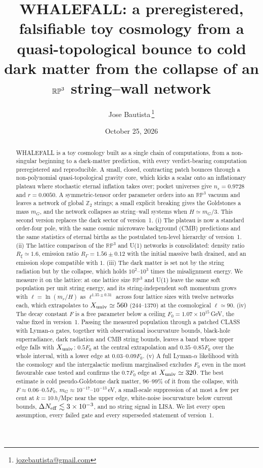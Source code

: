 \documentclass[11pt,a4paper]{article}
\title{\textbf{WHALEFALL: a preregistered, falsifiable toy cosmology from a quasi-topological bounce to cold dark matter from the collapse of an $\RP$ string--wall network}}
\author{Jose Bautista\,\orcidlink{0009-0001-6655-4028}\thanks{\href{mailto:jozebautista@gmail.com}{jozebautista@gmail.com}}}
\date{October 25, 2026}
\newcommand{\RP}{\mathbb{RP}^3}
\newcommand{\Ztwo}{\mathbb{Z}_2}
\newcommand{\RG}{R_\Gamma}
\newcommand{\Rxi}{R_\xi}
\newcommand{\Xu}{X_{\rm univ}}
\begin{document}
\maketitle

\begin{abstract}
WHALEFALL is a toy cosmology built as a single chain of computations, from a non-singular beginning to a dark-matter prediction, with every verdict-bearing computation preregistered and reproducible.
A small, closed, contracting patch bounces through a non-polynomial quasi-topological gravity core, which kicks a scalar onto an inflationary plateau where stochastic eternal inflation takes over; pocket universes give $n_s=0.9728$ and $r=0.0050$.
A symmetric-tensor order parameter orders into an $\RP$ vacuum and leaves a network of global $\Ztwo$ strings; a small explicit breaking gives the Goldstones a mass $m_G$, and the network collapses as string--wall systems when $H\simeq m_G/3$.
This second version replaces the dark sector of version~1.
(i) The plateau is now a standard order-four pole, with the same cosmic microwave background (CMB) predictions and the same statistics of eternal births as the postulated ten-level hierarchy of version~1.
(ii) The lattice comparison of the $\RP$ and U(1) networks is consolidated: density ratio $\Rxi\simeq1.6$, emission ratio $\RG=1.56\pm0.12$ with the initial massive bath drained, and an emission slope compatible with $1$.
(iii) The dark matter is set not by the string radiation but by the collapse, which holds $10^2$--$10^3$ times the misalignment energy. We measure it on the lattice: at one lattice size $\RP$ and U(1) leave the same soft population per unit string energy, and its string-independent soft momentum grows with $\ell=\ln(m_r/H)$ as $\ell^{1.35\pm0.31}$ across four lattice sizes with twelve networks each, which extrapolates to $\Xu\simeq560$ ($244$--$1370$) at the cosmological $\ell\simeq90$.
(iv) The decay constant $F$ is a free parameter below a ceiling $F_0=1.07\times10^{15}$\,GeV, the value fixed in version~1. Passing the measured population through a patched CLASS with Lyman-$\alpha$ gates, together with observational isocurvature bounds, black-hole superradiance, dark radiation and CMB string bounds, leaves a band whose upper edge falls with $\Xu$: $0.5F_0$ at the central extrapolation and $0.35$--$0.85F_0$ over the whole interval, with a lower edge at $0.03$--$0.09F_0$.
(v) A full Lyman-$\alpha$ likelihood with the cosmology and the intergalactic medium marginalised excludes $F_0$ even in the most favourable case tested and confirms the $0.7F_0$ edge at $\Xu\simeq320$.
The best estimate is cold pseudo-Goldstone dark matter, $96$--$99\%$ of it from the collapse, with $F\approx0.06$--$0.5F_0$, $m_G\approx10^{-17}$--$10^{-13}$\,eV, a small-scale suppression of at most a few per cent at $k=10\,h$/Mpc near the upper edge, white-noise isocurvature below current bounds, $\Delta N_{\rm eff}\lesssim3\times10^{-3}$, and no string signal in LISA.
We list every open assumption, every failed gate and every superseded statement of version~1.
\end{abstract}
\end{document}
